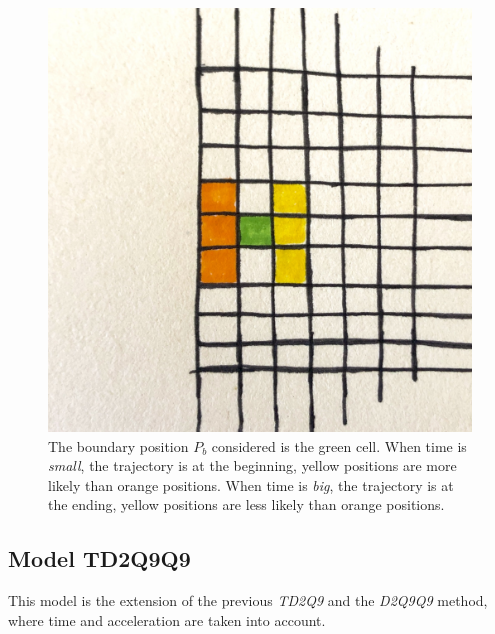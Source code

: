 \documentclass[class=article, crop=false]{standalone}
\begin{document}
\begin{figure}[h]
\centering
\includegraphics[scale=0.1]{draw/Boundary_position_in_out}
\captionsetup{width=.6\linewidth}
\caption{The boundary position $P_b$ considered is the green cell.
When time is \emph{small}, the trajectory is at the beginning, yellow positions are more likely than orange positions.
When time is \emph{big}, the trajectory is at the ending, yellow positions are less likely than orange positions.}
\label{fig:boundary_position}
\end{figure}


\FloatBarrier
\subsection{Model TD2Q9Q9}
This model is the extension of the previous \emph{TD2Q9} and the \emph{D2Q9Q9} method, where time and acceleration are taken into account.
\end{document}
